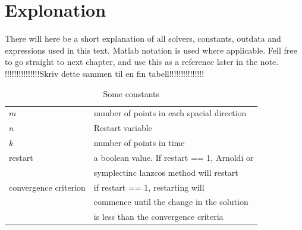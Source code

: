 \chapter{Explonation}
There will here be a short explanation of all solvers, constants, outdata and expressions used in this text. Matlab notation is used where applicable. Fell free to go straight to next chapter, and use this as a reference later in the note.
\\!!!!!!!!!!!!!!!Skriv dette sammen til en fin tabell!!!!!!!!!!!!!!!\\
\begin{table}[h]
\centering
\begin{tabular}{l|l}
 $m$& number of points in each spacial direction  \\
 $n$& Restart variable\\
 $k$& number of points in time \\
 restart& a boolean value. If restart == 1, Arnoldi or \\&symplectinc lanzcos method will restart \\
 convergence criterion& if restart == 1, restarting will\\& commence until the change in the solution\\& is less than the convergence criteria \\
\end{tabular}
\caption{Some constants}
\label{tab:constants}
\end{table}

